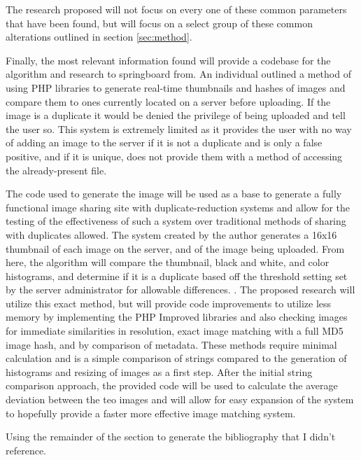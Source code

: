 \documentclass[11pt]{article}
\begin{document}
The research proposed will not focus on every one of these common parameters that have been found, but will focus on a select group of these common alterations outlined in section \ref{sec:method}.

Finally, the most relevant information found will provide a codebase for the algorithm and research to springboard from. An individual outlined a method of using PHP libraries to generate real-time thumbnails and hashes of images and compare them to ones currently located on a server before uploading. If the image is a duplicate it would be denied the privilege of being uploaded and tell the user so. This system is extremely limited as it provides the user with no way of adding an image to the server if it is not a duplicate and is only a false positive, and if it is unique, does not provide them with a method of accessing the already-present file.

The code used to generate the image will be used as a base to generate a fully functional image sharing site with duplicate-reduction systems and allow for the testing of the effectiveness of such a system over traditional methods of sharing with duplicates allowed. The system created by the author generates a 16x16 thumbnail of each image on the server, and of the image being uploaded. From here, the algorithm will compare the thumbnail, black and white, and color histograms, and determine if it is a duplicate based off the threshold setting set by the server administrator for allowable differences. \cite{catpa:gdcode}. The proposed research will utilize this exact method, but will provide code improvements to utilize less memory by implementing the PHP Improved libraries and also checking images for immediate similarities in resolution, exact image matching with a full MD5 image hash, and by comparison of metadata. These methods require minimal calculation and is a simple comparison of strings compared to the generation of histograms and resizing of images as a first step. After the initial string comparison approach, the provided code will be used to calculate the average deviation between the teo images and will allow for easy expansion of the system to hopefully provide a faster more effective image matching system.

Using the remainder of the section to generate the bibliography that I didn't reference.
\cite{nettuts:pdosqli}
\cite{about:rename}
\cite{php:uploads}
\cite{ubuntu:lampsetup}
\cite{nix:gdsetup}
\cite{php:gdimg}

\vspace*{-.2in}
\end{document}

